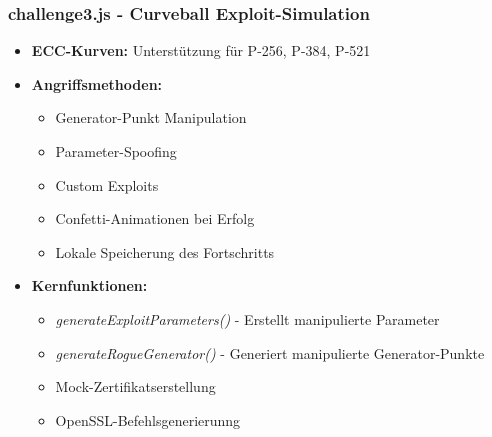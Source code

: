 \documentclass{article}
\begin{document}
\subsubsection{challenge3.js - Curveball Exploit-Simulation}
\begin{itemize}
    \item \textbf{ECC-Kurven:} Unterstützung für P-256, P-384, P-521
    \item \textbf{Angriffsmethoden:}
    \begin{itemize}
        \item Generator-Punkt Manipulation
        \item Parameter-Spoofing
        \item Custom Exploits
        \item Confetti-Animationen bei Erfolg
        \item Lokale Speicherung des Fortschritts
    \end{itemize}
    \item \textbf{Kernfunktionen:}
    \begin{itemize}
        \item \emph{generateExploitParameters()} - Erstellt manipulierte Parameter
        \item \emph{generateRogueGenerator()} - Generiert manipulierte Generator-Punkte
        \item Mock-Zertifikatserstellung
        \item OpenSSL-Befehlsgenerierunng
    \end{itemize}
\end{itemize}
\end{document}
